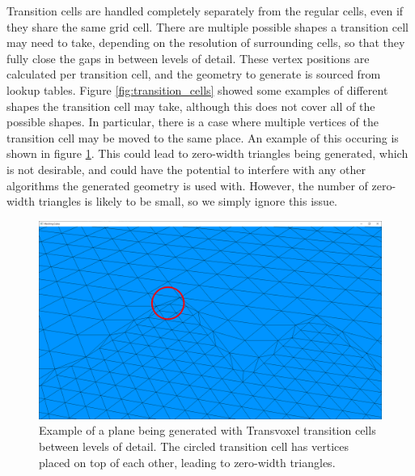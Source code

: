 \documentclass{article}
\begin{document}
\begin{enumerate}
Transition cells are handled completely separately from the regular cells, even if they share the same grid cell. There are multiple possible shapes a transition cell may need to take, depending on the resolution of surrounding cells, so that they fully close the gaps in between levels of detail. These vertex positions are calculated per transition cell, and the geometry to generate is sourced from lookup tables. Figure \ref{fig:transition_cells} showed some examples of different shapes the transition cell may take, although this does not cover all of the possible shapes. In particular, there is a case where multiple vertices of the transition cell may be moved to the same place. An example of this occuring is shown in figure \ref{fig:tv_transition_plane}. This could lead to zero-width triangles being generated, which is not desirable, and could have the potential to interfere with any other algorithms the generated geometry is used with. However, the number of zero-width triangles is likely to be small, so we simply ignore this issue.

\begin{figure}[H]
  \includegraphics[width=\textwidth]{tv_transition_plane}
  \caption{Example of a plane being generated with Transvoxel transition cells between levels of detail. The circled transition cell has vertices placed on top of each other, leading to zero-width triangles.}
  \label{fig:tv_transition_plane}
\end{figure}

\end{enumerate}
\end{document}
